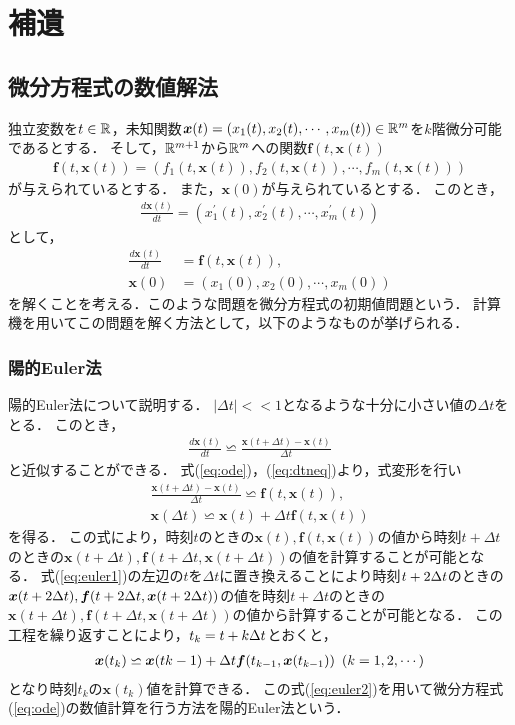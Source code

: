 \chapter{補遺}
\label{chap:補遺}
\section{微分方程式の数値解法}
独立変数を$t \in \mathbb{R}$，未知関数$\bm{x}(t) = \left(x_1(t),x_2(t),\cdots,x_m(t)\right) \in \mathbb{R}^m$を$k$階微分可能であるとする．
そして，$\mathbb{R}^{m+1}$から$\mathbb{R}^m$への関数$\bm{f}(t,\bm{x}(t))$
\begin{align}
    \bm{f}(t,\bm{x}(t)) = \left(f_1(t,\bm{x}(t)),f_2(t,\bm{x}(t)),\cdots,f_m(t,\bm{x}(t))\right)
\end{align}
が与えられているとする．
また，$\bm{x}(0)$が与えられているとする．
このとき，
\begin{align}
    \frac{d \bm{x}(t)}{dt} = \left(x_1^{\prime}(t),x_2^{\prime}(t),\cdots,x_m^{\prime}(t)\right)
\end{align}
として，
\begin{align}
    \frac{d \bm{x}(t)}{dt} &= \bm{f}(t,\bm{x}(t)), \label{eq:ode} \\
    \bm{x}(0) &= \left(x_1(0),x_2(0),\cdots,x_m(0)\right)
\end{align}
を解くことを考える．このような問題を微分方程式の初期値問題という．
計算機を用いてこの問題を解く方法として，以下のようなものが挙げられる．
\subsection{陽的Euler法}
陽的Euler法について説明する．
$|\Delta t| << 1 $となるような十分に小さい値の$\Delta t$をとる．
このとき，
\begin{align}
    \label{eq:dtneq}
    \frac{d \bm{x}(t)}{dt} \backsimeq \frac{\bm{x}(t+\Delta t) - \bm{x}(t)}{\Delta t}
\end{align}
と近似することができる．
式(\ref{eq:ode})，(\ref{eq:dtneq})より，式変形を行い
\begin{align}
    \frac{\bm{x}(t + \Delta t) - \bm{x}(t)}{\Delta t} \backsimeq \bm{f}(t,\bm{x}(t)),\\
    \bm{x}(\Delta t) \backsimeq \bm{x}(t) + \Delta t \bm{f}(t,\bm{x}(t)) \label{eq:euler1}
\end{align}
を得る．
この式により，時刻$t$のときの$\bm{x}(t),\bm{f}(t,\bm{x}(t))$の値から時刻$t+\Delta t$のときの$\bm{x}(t+\Delta t),\bm{f}(t+\Delta t,\bm{x}(t+\Delta t))$の値を計算することが可能となる．
式(\ref{eq:euler1})の左辺の$t$を$\Delta t$に置き換えることにより時刻$t + 2\Delta t$のときの$\bm{x}(t+2\Delta t),\bm{f}(t+2\Delta t,\bm{x}(t+2\Delta t))$の値を時刻$t+\Delta t$のときの$\bm{x}(t+\Delta t),\bm{f}(t+\Delta t,\bm{x}(t+\Delta t))$の値から計算することが可能となる．
この工程を繰り返すことにより，$t_k = t + k\Delta t$とおくと，
\begin{align}
    \bm{x}(t_k) \backsimeq \bm{x}(t{k-1}) + \Delta t\bm{f}(t_{k-1},\bm{x}(t_{k-1})) \ \left(k = 1,2,\cdots\right) \label{eq:euler2}
\end{align}
となり時刻$t_k$の$\bm{x}(t_k)$値を計算できる．
この式(\ref{eq:euler2})を用いて微分方程式(\ref{eq:ode})の数値計算を行う方法を陽的Euler法という．

